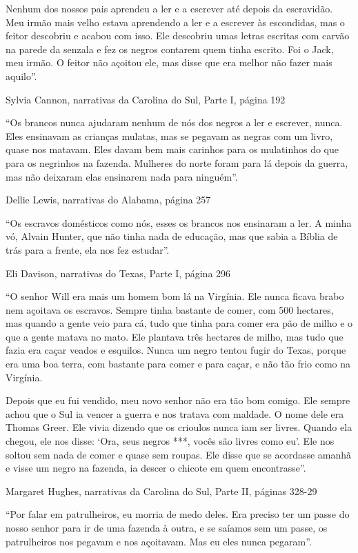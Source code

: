 Nenhum dos nossos pais aprendeu a ler e a escrever até depois da
escravidão. Meu irmão mais velho estava aprendendo a ler e a escrever às
escondidas, mas o feitor descobriu e acabou com isso. Ele descobriu umas
letras escritas com carvão na parede da senzala e fez os negros contarem
quem tinha escrito. Foi o Jack, meu irmão. O feitor não açoitou ele, mas
disse que era melhor não fazer mais aquilo''.

Sylvia Cannon, narrativas da Carolina do Sul, Parte I, página 192

``Os brancos nunca ajudaram nenhum de nós dos negros a ler e escrever,
nunca. Eles ensinavam as crianças mulatas, mas se pegavam as negras com
um livro, quase nos matavam. Eles davam bem mais carinhos para os
mulatinhos do que para os negrinhos na fazenda. Mulheres do norte foram
para lá depois da guerra, mas não deixaram elas ensinarem nada para
ninguém''.

Dellie Lewis, narrativas do Alabama, página 257

``Os escravos domésticos como nós, esses os brancos nos ensinaram a ler.
A minha vó, Alvain Hunter, que não tinha nada de educação, mas que sabia
a Bíblia de trás para a frente, ela nos fez estudar''.

Eli Davison, narrativas do Texas, Parte I, página 296

``O senhor Will era mais um homem bom lá na Virgínia. Ele nunca ficava
brabo nem açoitava os escravos. Sempre tinha bastante de comer, com 500
hectares, mas quando a gente veio para cá, tudo que tinha para comer era
pão de milho e o que a gente matava no mato. Ele plantava três hectares
de milho, mas tudo que fazia era caçar veados e esquilos. Nunca um negro
tentou fugir do Texas, porque era uma boa terra, com bastante para comer
e para caçar, e não tão frio como na Virgínia.

Depois que eu fui vendido, meu novo senhor não era tão bom comigo. Ele
sempre achou que o Sul ia vencer a guerra e nos tratava com maldade. O
nome dele era Thomas Greer. Ele vivia dizendo que os crioulos nunca iam
ser livres. Quando ela chegou, ele nos disse: `Ora, seus negros ***,
vocês são livres como eu'. Ele nos soltou sem nada de comer e quase sem
roupas. Ele disse que se acordasse amanhã e visse um negro na fazenda,
ia descer o chicote em quem encontrasse''.

Margaret Hughes, narrativas da Carolina do Sul, Parte II, páginas 328-29

``Por falar em patrulheiros, eu morria de medo deles. Era preciso ter um
passe do nosso senhor para ir de uma fazenda à outra, e se saíamos sem
um passe, os patrulheiros nos pegavam e nos açoitavam. Mas eu eles nunca
pegaram''.

